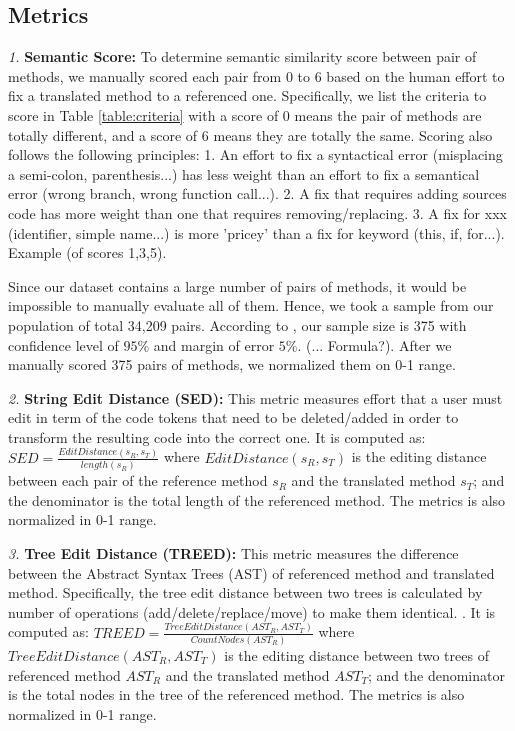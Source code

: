 \subsection{Metrics}

\emph{1.} \textbf{Semantic Score:} To determine semantic similarity score between pair of methods, we manually scored each pair from 0 to 6 based on the human effort to fix a translated method to a referenced one. Specifically, we list the criteria to score in Table \ref{table:criteria} with a score of 0 means the pair of methods are totally different, and a score of 6 means they are totally the same. Scoring also follows the following principles: 1. An effort to fix a syntactical error (misplacing a semi-colon, parenthesis...) has less weight than an effort to fix a semantical error (wrong branch, wrong function call...). 2. A fix that requires adding sources code has more weight than one that requires removing/replacing. 3. A fix for xxx (identifier, simple name...) is more 'pricey' than a fix for keyword (this, if, for...). Example (of scores 1,3,5). 

Since our dataset contains a large number of pairs of methods, it would be impossible to manually evaluate all of them. Hence, we took a sample from our population of total 34,209 pairs. According to \cite{website}, our sample size is 375 with confidence level of $95\%$ and margin of error $5\%$. 
(... Formula?). After we manually scored 375 pairs of methods, we normalized them on 0-1 range.

\emph{2.} \textbf{String Edit Distance (SED):} This metric measures
effort that a user must edit in term of the code tokens
that need to be deleted/added in order to transform the
resulting code into the correct one. It is computed as:  $SED = \frac{EditDistance\left(s_R, s_T\right)}{length\left(s_R\right)}$ where $EditDistance\left(s_R, s_T\right)$ is the editing distance between each pair of the reference method $s_R$ and the translated method $s_T$; and the denominator is the total length of the referenced method. The metrics is also normalized in 0-1 range.

\emph{3.} \textbf{Tree Edit Distance (TREED):} This metric measures the difference between the Abstract Syntax Trees (AST) of referenced method and translated method. Specifically, the tree edit distance between two trees is calculated by number of operations (add/delete/replace/move) to make them identical. \cite{algorithm}. 
It is computed as:  $TREED = \frac{TreeEditDistance\left(AST_R, AST_T\right)}{CountNodes \left(AST_R\right)}$ where $TreeEditDistance\left(AST_R, AST_T\right)$ is the editing distance between two trees of referenced method $AST_R$ and the translated method $AST_T$; and the denominator is the total nodes in the tree of the referenced method.  The metrics is also normalized in 0-1 range.

